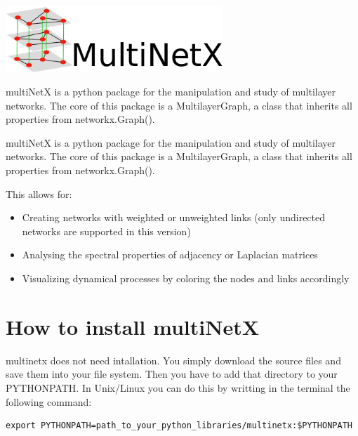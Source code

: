 \documentclass[11pt]{article}
\begin{document}
\setcounter{page}{0}
\newpage

\centerline{\includegraphics[height=2.5cm]{logo.png}} 

\vspace{25pt}

multiNetX is a python package for the manipulation and study of
multilayer networks. The core of this package is a MultilayerGraph, a
class that inherits all properties from networkx.Graph().


multiNetX is a python package for the manipulation and study of
multilayer networks. The core of this package is a MultilayerGraph, a
class that inherits all properties from networkx.Graph().

This allows for:

\begin{itemize}
\itemsep1pt\parskip0pt
\item
  Creating networks with weighted or unweighted links (only undirected
  networks are supported in this version)
\item
  Analysing the spectral properties of adjacency or Laplacian matrices
\item
  Visualizing dynamical processes by coloring the nodes and links
  accordingly
\end{itemize}

\pagebreak

\tableofcontents

\pagebreak

\section{How to install multiNetX}\label{how-to-install-multinetx}

multinetx does not need intallation. You simply download the source
files and save them into your file system. Then you have to add that
directory to your PYTHONPATH. In Unix/Linux you can do this by writting
in the terminal the following command:

\begin{verbatim}
export PYTHONPATH=path_to_your_python_libraries/multinetx:$PYTHONPATH
\end{verbatim}
\end{document}

